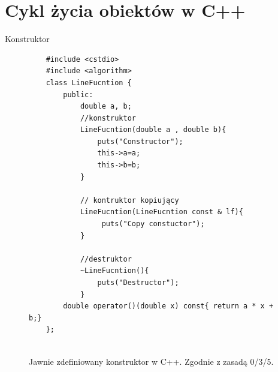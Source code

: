 \documentclass[xcolor=table]{beamer}
\begin{document}
\section{Cykl życia obiektów w C++}








\begin{frame}[containsverbatim]{Konstruktor}
    \begin{figure}
        \centering
        \tiny
    \begin{verbatim}
    #include <cstdio>
    #include <algorithm>
    class LineFucntion {
        public:
            double a, b;
            //konstruktor
            LineFucntion(double a , double b){ 
                puts("Constructor");
                this->a=a;
                this->b=b;
            }

            // kontruktor kopiujący 
            LineFucntion(LineFucntion const & lf){
                 puts("Copy constuctor");
            }

            //destruktor
            ~LineFucntion(){
                puts("Destructor");
            }
        double operator()(double x) const{ return a * x + b;}
    };


    \end{verbatim}
        \label{fig:cpp-constructor}
        \caption{Jawnie zdefiniowany konstruktor w C++. Zgodnie z zasadą 0/3/5.}
    \end{figure}
    
\end{frame}
\end{document}
